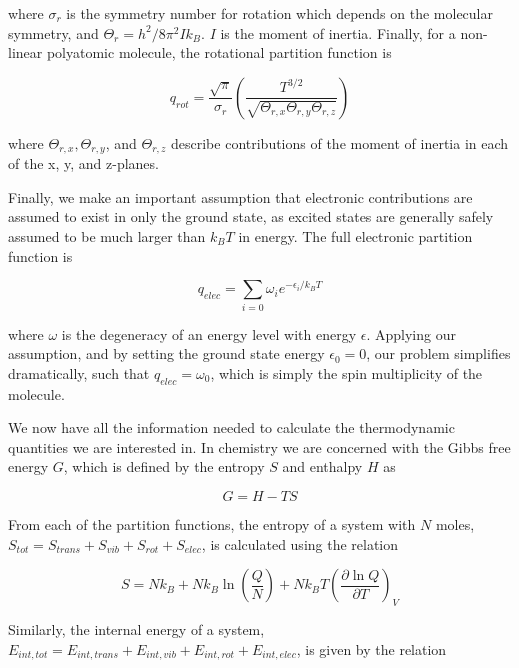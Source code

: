 \noindent where $\sigma_r$ is the symmetry number for rotation which depends on
the molecular symmetry, and $\Theta_r = h^2/8\pi^2Ik_B$. $I$ is the moment of
inertia. Finally, for a non-linear polyatomic molecule, the rotational
partition function is

\begin{equation}
  q_{rot} = \frac{\sqrt{\pi}}{\sigma_r}\left(\frac{T^{3/2}}{\sqrt{\Theta_{r,x}\Theta_{r,y}\Theta_{r,z}}}\right)
\end{equation}

\noindent where $\Theta_{r,x}, \Theta_{r,y}$, and $\Theta_{r,z}$ describe
contributions of the moment of inertia in each of the x, y, and z-planes.

Finally, we make an important assumption that electronic contributions are
assumed to exist in only the ground state, as excited states are generally
safely assumed to be much larger than $k_B T$ in energy. The full electronic
partition function is

\begin{equation}
  q_{elec} = \sum_{i=0} \omega_i e^{-\epsilon_i/k_B T}
\end{equation}

\noindent where $\omega$ is the degeneracy of an energy level with energy
$\epsilon$. Applying our assumption, and by setting the ground state energy
$\epsilon_0=0$, our problem simplifies dramatically, such that $q_{elec} =
\omega_0$, which is simply the spin multiplicity of the molecule.

We now have all the information needed to calculate the thermodynamic
quantities we are interested in. In chemistry we are concerned with the Gibbs
free energy $G$, which is defined by the entropy $S$ and enthalpy $H$ as

\begin{equation}
  G = H - TS
\end{equation}

\noindent From each of the partition functions, the entropy of a system with
$N$ moles, $S_{tot} = S_{trans} + S_{vib } +S_{rot} + S_{elec}$, is calculated
using the relation

\begin{equation}
  S = Nk_B + Nk_B\ln\left( \frac{Q}{N} \right) + Nk_B T \left( \frac{\partial
      \ln Q}{\partial T} \right)_V
\end{equation}

\noindent Similarly, the internal energy of a system, $E_{int,tot} =
E_{int,trans} + E_{int,vib} + E_{int,rot} + E_{int,elec}$, is given by the
relation

